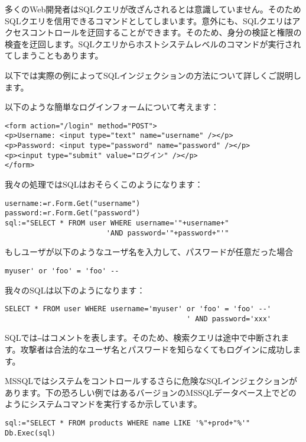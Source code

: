 多くのWeb開発者はSQLクエリが改ざんされるとは意識していません。そのためSQLクエリを信用できるコマンドとしてしまいます。意外にも、SQLクエリはアクセスコントロールを迂回することができます。そのため、身分の検証と権限の検査を迂回します。SQLクエリからホストシステムレベルのコマンドが実行されてしまうこともあります。

以下では実際の例によってSQLインジェクションの方法について詳しくご説明します。

以下のような簡単なログインフォームについて考えます：

\begin{lstlisting}[numbers=none]
<form action="/login" method="POST">
<p>Username: <input type="text" name="username" /></p>
<p>Password: <input type="password" name="password" /></p>
<p><input type="submit" value="ログイン" /></p>
</form>
\end{lstlisting}

我々の処理ではSQLはおそらくこのようになります：

\begin{lstlisting}[numbers=none]
username:=r.Form.Get("username")
password:=r.Form.Get("password")
sql:="SELECT * FROM user WHERE username='"+username+"
                        'AND password='"+password+"'"
\end{lstlisting}

もしユーザが以下のようなユーザ名を入力して、パスワードが任意だった場合

\begin{lstlisting}[numbers=none]
myuser' or 'foo' = 'foo' --
\end{lstlisting}

我々のSQLは以下のようになります：

\begin{lstlisting}[numbers=none]
SELECT * FROM user WHERE username='myuser' or 'foo' = 'foo' --'
                                           ' AND password='xxx'
\end{lstlisting}

SQLでは\texttt{--}はコメントを表します。そのため、検索クエリは途中で中断されます。攻撃者は合法的なユーザ名とパスワードを知らなくてもログインに成功します。

MSSQLではシステムをコントロールするさらに危険なSQLインジェクションがあります。下の恐ろしい例ではあるバージョンのMSSQLデータベース上でどのようにシステムコマンドを実行するか示しています。



\begin{lstlisting}[numbers=none]
sql:="SELECT * FROM products WHERE name LIKE '%"+prod+"%'"
Db.Exec(sql)
\end{lstlisting}

